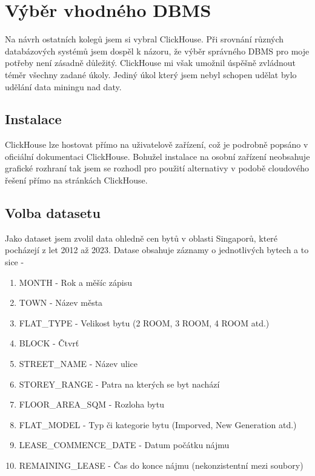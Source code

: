 \chapter{Výběr vhodného DBMS}
Na návrh ostatních kolegů jsem si vybral ClickHouse. Při srovnání různých databázových systémů jsem dospěl k názoru, že výběr správného DBMS pro moje potřeby není zásadně důležitý. ClickHouse mi však umožnil úspěšně zvládnout téměr všechny zadané úkoly. Jediný úkol který jsem nebyl schopen udělat bylo udělání data miningu nad daty.

\section{Instalace}
ClickHouse lze hostovat přímo na uživatelově zařízení, což je podrobně popsáno v oficiální dokumentaci ClickHouse. Bohužel instalace na osobní zařízení neobsahuje grafické rozhraní tak jsem se rozhodl pro použití alternativy v podobě cloudového řešení přímo na stránkách ClickHouse.

\section{Volba datasetu}
Jako dataset jsem zvolil data ohledně cen bytů v oblasti Singaporů, které pocházejí z let 2012 až 2023. Datase obsahuje záznamy o jednotlivých bytech a to sice 
-
\begin{enumerate}
    \item MONTH - Rok a měšíc zápisu
    \item TOWN - Název města
    \item FLAT\_TYPE - Velikost bytu (2 ROOM, 3 ROOM, 4 ROOM atd.)
    \item BLOCK - Čtvrť
    \item STREET\_NAME - Název ulice
    \item STOREY\_RANGE - Patra na kterých se byt nachází 
    \item FLOOR\_AREA\_SQM - Rozloha bytu
    \item FLAT\_MODEL - Typ či kategorie bytu (Imporved, New Generation atd.)
    \item LEASE\_COMMENCE\_DATE - Datum počátku nájmu
    \item REMAINING\_LEASE - Čas do konce nájmu (nekonzistentní mezi soubory)
\end{enumerate}